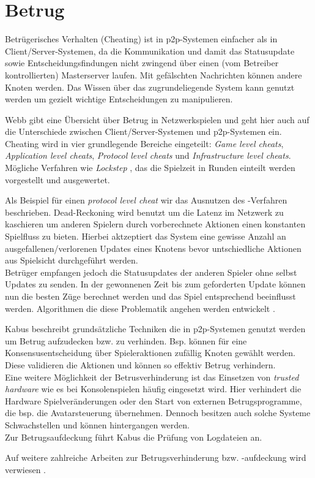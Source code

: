 \section{Betrug}
\label{chap:grundlagen:cheating}
Betrügerisches Verhalten (Cheating) ist in p2p-Systemen einfacher als in Client/Server-Systemen, da die Kommunikation und damit das Statusupdate sowie Entscheidungsfindungen nicht zwingend über einen (vom Betreiber kontrollierten) Masterserver laufen. Mit gefälschten Nachrichten können andere Knoten werden. Das Wissen über das zugrundeliegende System kann genutzt werden um gezielt wichtige Entscheidungen zu manipulieren.

Webb \cite{Webb2007Cheating} gibt eine Übersicht über Betrug in Netzwerkspielen und geht hier auch auf die Unterschiede zwischen Client/Server-Systemen und p2p-Systemen ein. Cheating wird in vier grundlegende Bereiche eingeteilt: \emph{Game level cheats}, \emph{Application level cheats}, \emph{Protocol level cheats} und \emph{Infrastructure level cheats}. Mögliche Verfahren wie \emph{Lockstep} \cite{Baughman2007}, das die Spielzeit in Runden einteilt werden vorgestellt und ausgewertet.

Als Beispiel für einen \emph{protocol level cheat} wir das Ausnutzen des \emph{}-Verfahren \cite{Pantel2002} beschrieben. Dead-Reckoning wird benutzt um die Latenz im Netzwerk zu kaschieren um anderen Spielern durch vorberechnete Aktionen einen konstanten Spielfluss zu bieten. Hierbei aktzeptiert das System eine gewisse Anzahl an ausgefallenen/verlorenen Updates eines Knotens bevor untschiedliche Aktionen aus Spielsicht durchgeführt werden.\\
Betrüger empfangen jedoch die Statusupdates der anderen Spieler ohne selbst Updates zu senden. In der gewonnenen Zeit bis zum geforderten Update können nun die besten Züge berechnet werden und das Spiel entsprechend beeinflusst werden. Algorithmen die diese Problematik angehen werden entwickelt \cite{Aggarwal2005}.

Kabus \cite{Kabus2005Addressing} beschreibt grundsätzliche Techniken die in p2p-Systemen genutzt werden um Betrug aufzudecken bzw. zu verhinden. Bsp. können für eine Konsensusentscheidung über Spieleraktionen zufällig Knoten gewählt werden. Diese validieren die Aktionen und können so effektiv Betrug verhindern.\\
Eine weitere Möglichkeit der Betrusverhinderung ist das Einsetzen von \emph{trusted hardware} wie es bei Konsolenspielen häufig eingesetzt wird. Hier verhindert die Hardware Spielveränderungen oder den Start von externen Betrugsprogramme, die bsp. die Avatarsteuerung übernehmen. Dennoch besitzen auch solche Systeme Schwachstellen und können hintergangen werden.\\
Zur Betrugsaufdeckung führt Kabus die Prüfung von Logdateien an.

Auf weitere zahlreiche Arbeiten zur Betrugsverhinderung bzw. -aufdeckung wird verwiesen \cite{Ferretti2008Cheating, Gauthierdickey2004Low, Kabus2007Design, Dautermann2007, Kabus2009}.
